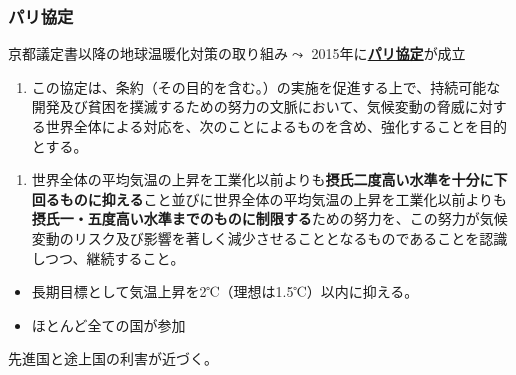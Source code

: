 \documentclass[
  xelatex,
  ja=standard]{bxjsarticle}
\providecommand{\tightlist}{%
  \setlength{\itemsep}{0pt}\setlength{\parskip}{0pt}}\usepackage{longtable,booktabs,array}
\begin{document}
\hypertarget{ux30d1ux30eaux5354ux5b9a}{%
\subsubsection{パリ協定}\label{ux30d1ux30eaux5354ux5b9a}}

京都議定書以降の地球温暖化対策の取り組み\(\leadsto\)
2015年に\href{https://www.mofa.go.jp/mofaj/ic/ch/page1w_000119.html}{\textbf{パリ協定}}が成立

\begin{tcolorbox}[enhanced jigsaw, left=2mm, arc=.35mm, breakable, coltitle=black, bottomtitle=1mm, toprule=.15mm, leftrule=.75mm, colbacktitle=quarto-callout-note-color!10!white, colback=white, colframe=quarto-callout-note-color-frame, bottomrule=.15mm, titlerule=0mm, toptitle=1mm, opacitybacktitle=0.6, opacityback=0, rightrule=.15mm, title=\textcolor{quarto-callout-note-color}{\faInfo}\hspace{0.5em}{\href{https://www.env.go.jp/earth/ondanka/cop/shiryo.html}{パリ協定}　第2条}]

\begin{enumerate}
\def\labelenumi{\arabic{enumi}.}
\tightlist
\item
  この協定は、条約（その目的を含む。）の実施を促進する上で、持続可能な開発及び貧困を撲滅するための努力の文脈において、気候変動の脅威に対する世界全体による対応を、次のことによるものを含め、強化することを目的とする。
\end{enumerate}

\begin{enumerate}
\def\labelenumi{\alph{enumi}.}
\tightlist
\item
  世界全体の平均気温の上昇を工業化以前よりも\textbf{摂氏二度高い水準を十分に下回るものに抑える}こと並びに世界全体の平均気温の上昇を工業化以前よりも\textbf{摂氏一・五度高い水準までのものに制限する}ための努力を、この努力が気候変動のリスク及び影響を著しく減少させることとなるものであることを認識しつつ、継続すること。
\end{enumerate}

\end{tcolorbox}

\begin{itemize}
\tightlist
\item
  長期目標として気温上昇を2℃（理想は1.5℃）以内に抑える。
\item
  ほとんど全ての国が参加
\end{itemize}

先進国と途上国の利害が近づく。
\end{document}
